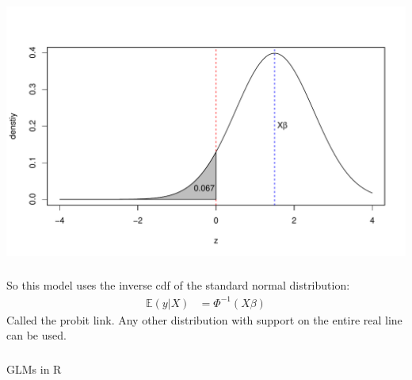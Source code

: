 \begin{frame}[fragile] \frametitle{}

\begin{center}
\includegraphics[width=\textwidth]{img/fig02e}
\end{center}

\end{frame}

\begin{frame}[fragile] \frametitle{}

So this model uses the inverse cdf of the standard normal
distribution:
\begin{align*}
\mathbb{E} (y | X) &= \Phi^{-1} (X\beta)
\end{align*}
Called the probit link. \pause Any other distribution with
support on the entire real line can be used.

\end{frame}

\begin{frame}[fragile] \frametitle{}

\begin{flushright}
{\color{yaleblue}\sc\fontsize{1cm}{0cm}\selectfont GLMs in R}
\end{flushright}

\end{frame}



